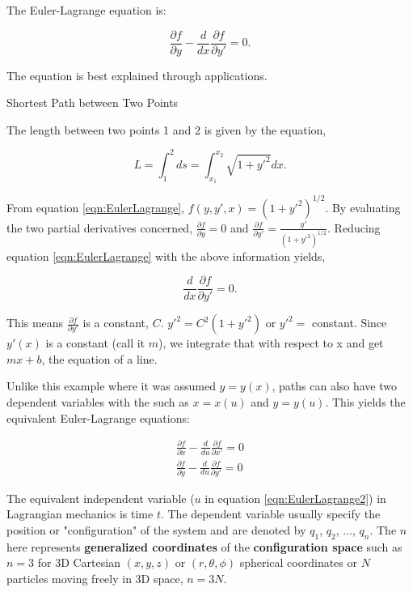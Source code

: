 
The Euler-Lagrange equation is:

\begin{equation}
    \frac{\partial f}{\partial y} - \frac{d}{dx} \frac{\partial f}{\partial y'} = 0.
    \label{eqn:EulerLagrange}
\end{equation}

The equation is best explained through applications.


{\exbegin Shortest Path between Two Points}

The length between two points 1 and 2 is given by the equation,

\begin{equation*}
    L = \int^2_1 ds = \int^{x_2}_{x_1} \sqrt{1+y'^2} dx.
\end{equation*}

From equation \ref{eqn:EulerLagrange}, $f(y,y',x)=(1+y'^2)^{1/2}$. By evaluating the two partial derivatives concerned, $\frac{\partial f}{\partial y} = 0$ and $\frac{\partial f}{\partial y'} = \frac{y'}{(1+y'^2)^{1/2}}$. Reducing equation \ref{eqn:EulerLagrange} with the above information yields,

\begin{equation*}
    \frac{d}{dx}\frac{\partial f}{\partial y'} = 0.
\end{equation*}

\noindent This means $\frac{\partial f}{\partial y'}$ is a constant, $C$. $y'^2 = C^2(1+y'^2)$ or $y'^2 =$ constant. Since $y'(x)$ is a constant (call it $m$), we integrate that with respect to x and get $mx + b$, the equation of a line.

\exend

Unlike this example where it was assumed $y=y(x)$, paths can also have two dependent variables with the such as $x=x(u)$ and $y=y(u)$. This yields the equivalent Euler-Lagrange equations:

\begin{gather}
    \frac{\partial f}{\partial x} - \frac{d}{du} \frac{\partial f}{\partial x'} = 0\\
    \frac{\partial f}{\partial y} - \frac{d}{du} \frac{\partial f}{\partial y'} = 0
    \label{eqn:EulerLagrange2}
\end{gather}

The equivalent independent variable ($u$ in equation \ref{eqn:EulerLagrange2}) in Lagrangian mechanics is time $t$. The dependent variable usually specify the position or "configuration" of the system and are denoted by $q_1$, $q_2$, $\dots$, $q_n$. The $n$ here represents {\bfseries generalized coordinates} of the {\bfseries configuration space} such as $n=3$ for 3D Cartesian $(x,y,z)$ or $(r,\theta,\phi)$ spherical coordinates or $N$ particles moving freely in 3D space, $n=3N$.

